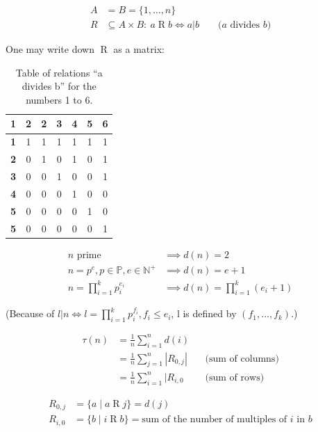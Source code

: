 \begin{align*}
A &= B = \{1,\ldots,n\} \\
R & \subseteq A\times B :\ a\operatorname{R} b\iff a|b && \text{ ($a$ divides $b$)}
\end{align*}
\bigskip

One may write down $\operatorname{R}$ as a matrix:

\begin{table}[H]
	\begin{center}
		\begin{tabular}{l|cccccc}
			\textbf{1} & \textbf{2} & \textbf{2} & \textbf{3} & \textbf{4} & \textbf{5} & \textbf{6} \\
			\hline \textbf{1} & 1 & 1 & 1 & 1 &  1 & 1 \\
			\textbf{2} & 0 & 1 & 0 & 1 &  0 & 1 \\
			\textbf{3} & 0 & 0 & 1 & 0 &  0 & 1 \\
			\textbf{4} & 0 & 0 & 0 & 1 &  0 & 0 \\
			\textbf{5} & 0 & 0 & 0 & 0 &  1 & 0 \\
			\textbf{5} & 0 & 0 & 0 & 0 &  0 & 1
		\end{tabular}
		\caption{Table of relations ``a divides b'' for the numbers 1 to 6.}
	\end{center}
\end{table}

\begin{align*}
\text{$n$ prime}
    &\implies d(n) = 2 \\
n = p^e, p\in \mathbb{P}, e\in \mathbb{N}^{+}
    &\implies d(n) = e+1 \\
n = \prod_{i=1}^k p_i^{e_i}
    &\implies d(n) = \prod_{i=1}^k (e_i+1)
\end{align*}

(Because of $l | n \iff l = \prod_{i=1}^k p_i^{f_i},
f_i ≤ e_i$, l is defined by $(f_1,\ldots,f_k)$.)

\begin{align*}
\tau(n) &= \frac{1}{n}\sum_{i=1}^n d(i)\\
    &= \frac{1}{n}\sum_{j=1}^n |R_{0,j}| && \text{(sum of columns)} \\
    &= \frac{1}{n}\sum_{i=1}^n |R_{i,0} && \text{(sum of rows)}
\end{align*}

\begin{align*}
R_{0,j} &= \{a \mid a \operatorname{R} j\} = d(j) \\
R_{i,0} &= \{b \mid i\operatorname{R} b\}
    = \text{sum of the number of multiples of $i$ in $b$}
\end{align*}

